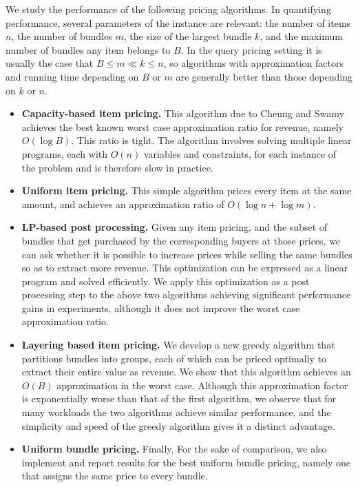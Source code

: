 We study the performance of the following pricing algorithms. In quantifying performance, several parameters of the instance are relevant: the number of items $n$, the number of bundles $m$, the size of the largest bundle $k$, and the maximum number of bundles any item belongs to $B$. In the query pricing setting it is usually the case that $B\le m\ll k\le n$, so algorithms with approximation factors and running time depending on $B$ or $m$ are generally better than those depending on $k$ or $n$.
\begin{itemize}
\item {\bf Capacity-based item pricing.} This algorithm due to Cheung and Swamy~\cite{cheung2008approximation} achieves the best known worst case approximation ratio for revenue, namely $O(\log B)$. This ratio is tight. The algorithm involves solving multiple linear programs, each with $O(n)$ variables and constraints, for each instance of the problem and is therefore slow in practice.
\item {\bf Uniform item pricing.} This simple algorithm prices every item at the same amount, and achieves an approximation ratio of $O(\log n+\log m)$. 
\item {\bf LP-based post processing.} Given any item pricing, and the subset of bundles that get purchased by the corresponding buyers at those prices, we can ask whether it is possible to increase prices while selling the same bundles so as to extract more revenue. This optimization can be expressed as a linear program and solved efficiently. We apply this optimization as a post processing step to the above two algorithms achieving significant performance gains in experiments, although it does not improve the worst case approximation ratio.
\item {\bf Layering based item pricing.} We develop a new greedy algorithm that partitions bundles into groups, each of which can be priced optimally to extract their entire value as revenue. We show that this algorithm achieves an $O(B)$ approximation in the worst case. Although this approximation factor is exponentially worse than that of the first algorithm, we observe that for many workloads the two algorithms achieve similar performance, and the simplicity and speed of the greedy algorithm gives it a distinct advantage. 
\item {\bf Uniform bundle pricing.} Finally, For the sake of comparison, we also implement and report results for the best uniform bundle pricing, namely one that assigns the same price to every bundle.
\end{itemize}


